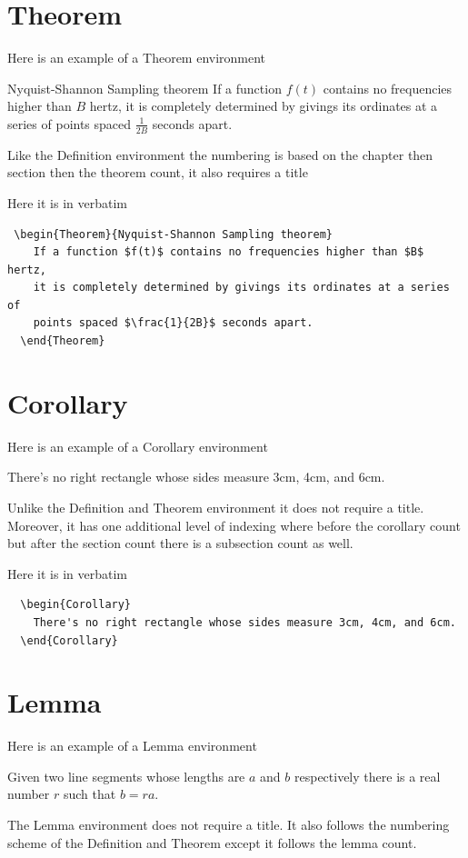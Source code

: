 \documentclass[letterpaper,10pt,twoside,twocolumn,openany]{book}
\begin{document}
\section{Theorem}
Here is an example of a Theorem environment
\begin{Theorem}{Nyquist-Shannon Sampling theorem}
  If a function $f(t)$ contains no frequencies higher than $B$ hertz, it is completely determined by givings its ordinates at a series of points spaced $\frac{1}{2B}$ seconds apart.
\end{Theorem}
Like the Definition environment the numbering is based on the chapter then section then the theorem count, it also requires a title

Here it is in verbatim
\begin{verbatim}
 \begin{Theorem}{Nyquist-Shannon Sampling theorem}
    If a function $f(t)$ contains no frequencies higher than $B$ hertz,
    it is completely determined by givings its ordinates at a series of 
    points spaced $\frac{1}{2B}$ seconds apart.
  \end{Theorem}
\end{verbatim}

\section{Corollary}
Here is an example of a Corollary environment
\begin{Corollary}
  There's no right rectangle whose sides measure 3cm, 4cm, and 6cm.  
\end{Corollary}
Unlike the Definition and Theorem environment it does not require a title. Moreover, it has one additional level of indexing where before the corollary count but after the section count there is a subsection count as well.

Here it is in verbatim 
\begin{verbatim}
  \begin{Corollary}
    There's no right rectangle whose sides measure 3cm, 4cm, and 6cm.  
  \end{Corollary}
\end{verbatim}

\section{Lemma}
Here is an example of a Lemma environment
\begin{Lemma}
  Given two line segments whose lengths are $a$ and $b$ respectively there is a real number $r$ such that $b=ra$.
\end{Lemma}
The Lemma environment does not require a title. It also follows the numbering scheme of the Definition and Theorem except it follows the lemma count.
\end{document}
